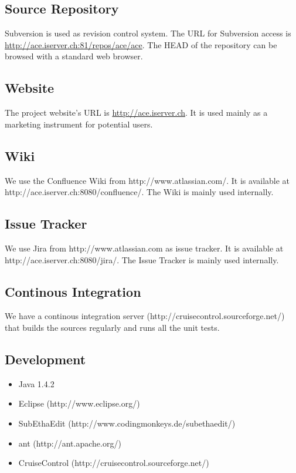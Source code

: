 \documentclass[11pt,a4paper]{article}
\begin{document}
\subsection{Source Repository}
Subversion is used as revision control system. The URL for Subversion access is
\href{http://ace.iserver.ch:81/repos/ace/ace}{http://ace.iserver.ch:81/repos/ace/ace}. The HEAD of the repository can
be browsed with a standard web browser.

\subsection{Website}
The project website's URL is \href{http://ace.iserver.ch}{http://ace.iserver.ch}. It is used mainly as a marketing instrument
for potential users. 

\subsection{Wiki}
We use the Confluence Wiki from http://www.atlassian.com/. It is available
at http://ace.iserver.ch:8080/confluence/. The Wiki is mainly used internally.

\subsection{Issue Tracker}
We use Jira from http://www.atlassian.com as issue tracker. It is available
at http://ace.iserver.ch:8080/jira/. The Issue Tracker is mainly used internally.

\subsection{Continous Integration}
We have a continous integration server (http://cruisecontrol.sourceforge.net/) that builds the
sources regularly and runs all the unit tests.

\subsection{Development}
\begin{itemize}
 \item Java 1.4.2
 \item Eclipse (http://www.eclipse.org/)
 \item SubEthaEdit (http://www.codingmonkeys.de/subethaedit/)
 \item ant (http://ant.apache.org/)
 \item CruiseControl (http://cruisecontrol.sourceforge.net/)
\end{itemize}
\end{document}
